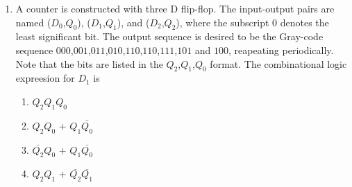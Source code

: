 \documentclass{article}
\begin{document}
\begin{enumerate}
\item A counter is constructed with three D flip-flop. The input-output pairs are named ($D_0$,$Q_0$), ($D_1$,$Q_1$), and ($D_2$,$Q_2$), where the subscript 0 denotes the least significant bit. The output sequence is desired to be the Gray-code sequence $000$,$001$,$011$,$010$,$110$,$110$,$111$,$101$ and $100$, reapeating periodically. Note that the bits are listed in the $Q_2$,$Q_1$,$Q_0$ format. The combinational logic expreesion for $D_1$ is
\begin{enumerate}[label=(\Alph*)]
\item $Q_2Q_1Q_0$
\item $Q_2Q_0$ + $Q_1\bar{Q_0}$
\item $\bar{Q_2}Q_0$ + $Q_1\bar{Q_0}$
\item $Q_2Q_1$ + $\bar{Q_2}$$\bar{Q_1}$
\end{enumerate}
\end{enumerate}
\end{document}
